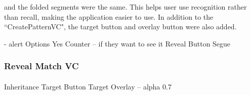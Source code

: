 \documentclass[11pt]{article}
\begin{document}
            and the folded segments were the same. This helps user use recognition rather than recall, making the application easier to use. In addition to the ``CreatePatternVC", the target button and overlay button were also added.
            
            - alert
            Options
            Yes Counter – if they want to see it
            Reveal Button Segue

 \subsubsection{Reveal Match VC}
    
            \paragraph{}
            Inheritance
            Target Button
            Target Overlay – alpha 0.7
\end{document}
